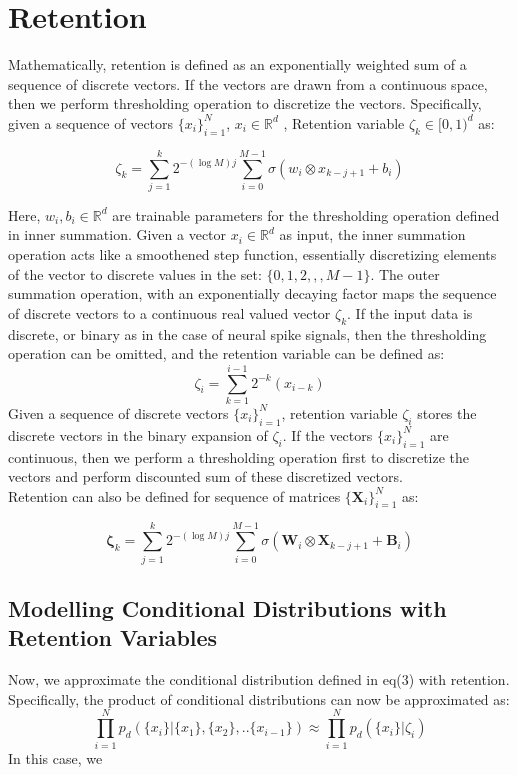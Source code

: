 \section{Retention}
Mathematically, retention is defined as an exponentially weighted sum of a sequence of discrete vectors. If the vectors are drawn from a continuous space, then we perform thresholding operation to discretize the vectors. 
Specifically, given a sequence of vectors $\{x_i\}_{i=1}^N$, $x_i \in \mathbb{R}^d$ , Retention variable $ \zeta_k \in [0,1)^d$ as:

\begin{equation}
    \zeta_k = \sum_{j=1}^{k} 2^{- (\log M)j} \sum_{i=0}^{M-1} \sigma(w_i \otimes x_{k-j+1} + b_i)
\end{equation}


Here, $w_i, b_i \in \mathbb{R}^d$ are trainable parameters for the thresholding operation defined in inner summation. Given a vector $x_i \in \mathbb{R}^d$ as input, the inner summation operation acts like a smoothened step function, essentially discretizing elements of the vector to discrete values in the set: $\{0,1,2,,,M-1\}$. The outer summation operation, with an exponentially decaying factor maps the sequence of discrete vectors to a continuous real valued vector $\zeta_k$. If the input data is discrete, or binary as in the case of neural spike signals, then the thresholding operation can be omitted, and the retention variable can be defined as: 
\begin{equation}
    \zeta_i = \sum_{k=1}^{i-1} 2^{-k} (x_{i-k}) 
\end{equation}
Given a sequence of discrete vectors $\{x_i\}_{i=1}^N$, retention variable $\zeta_i$ stores the discrete vectors in the binary expansion of $\zeta_i$. If the vectors  $\{x_i\}_{i=1}^N$ are continuous, then we perform a thresholding operation first to discretize the vectors and perform discounted sum of these discretized vectors. \\

Retention can also be defined for sequence of matrices $\{\mathbf{X}_i\}_{i=1}^N$ as:

\begin{equation}
    \mathbf{\zeta}_k = \sum_{j=1}^{k} 2^{- (\log M)j} \sum_{i=0}^{M-1} \sigma(\mathbf{W}_i \otimes \mathbf{X}_{k-j+1} + \mathbf{B}_i)
\end{equation}

\subsection{Modelling Conditional Distributions with Retention Variables}
Now, we approximate the conditional distribution defined in eq(3) with retention. Specifically, the product of conditional distributions can now be approximated as:
\begin{equation}
   \prod_{i=1}^{N} p_d(\{x_{i}\}| \{x_1\},\{x_2\},..\{x_{i-1}\}) 
   \approx  \prod_{i=1}^{N} p_d(\{x_{i}\}|\zeta_i)
\end{equation}
In this case, we 


